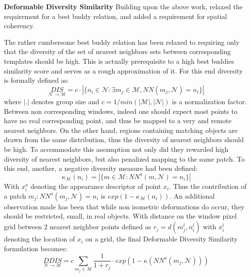 \documentclass[10pt,twocolumn,letterpaper]{article}
\begin{document}
\textbf{Deformable Diversity Similarity}
Building upon the above work, \cite{talmi2017template}  relaxed the requirement for a best buddy relation, and added a requirement for spatial coherency.

The rather cumbersome best buddy relation has been relaxed to requiring only that the diversity of the set of nearest neighbors sets between corresponding templates should be high. This is actually prerequisite to a high best buddies similarity score and serves as a rough approximation of it. For this end diversity is formally defined as:
\begin{equation}
\underset{\mathcal{N}\rightarrow\mathcal{M}}{DIS}=c\cdot |\{n_i\in\mathcal{N}:\exists m_j\in\mathcal{M},NN(m_j,\mathcal{N})=n_i\}|
\end{equation}
where $|{.}|$ denotes group size and $c=1/min(|\mathcal{M}|,|\mathcal{N}|)$ is a normalization factor. Between non corresponding windows, indeed one should expect most points to have no real corresponding point, and thus be mapped to a very and remote nearest neighbors.  On the other hand, regions containing matching objects are drawn from the same distribution, thus the diversity of nearest neighbors should be high.
To accommodate this assumption not only did they rewarded high diversity of nearest neighbors, but also penalized mapping to the same patch. To this end, another, a negative diversity measure had been defined:
\begin{equation}
\kappa_{\mathcal{M}}(n_i)=|\{m\in\mathcal{M}:NN^a(m,\mathcal{N})=n_i\}|
\end{equation}
With $x_i^a$ denoting the appearance descriptor of point $x_i$.
Thus the contribution of a patch $m_j:NN^a(m_j,\mathcal{N})=n_i$ is $exp(1-\kappa_{\mathcal{M}}(n_i))$. 
An additional observation made has been that while non isometric deformations do occur, they should be restricted, small, in real objects. With  distance on the window pixel grid between 2 nearest neighbor points defined as $r_j=d(m_j^l,n_i^l)$ with $x_i^l$ denoting the location of $x_i$ on a grid, the final Deformable Diversity Similarity formulation becomes:
\begin{equation}
\underset{\mathcal{N}\rightarrow\mathcal{M}}{DDIS}=c\sum_{m_j\in\mathcal{M}} \frac{1}{1+r_j} \cdot exp(1-\kappa (NN^a(m_j,\mathcal{N})))
\end{equation}

\end{document}
